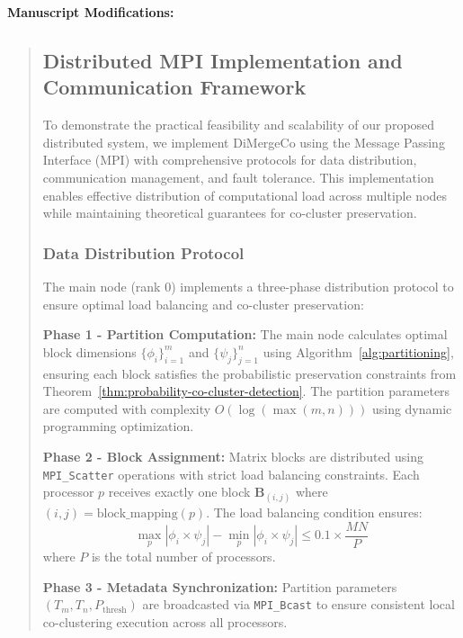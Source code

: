 \documentclass{ar2rc}
\begin{document}
\textbf{Manuscript Modifications:}

\begin{quote}
\subsection{Distributed MPI Implementation and Communication Framework}
\label{subsec:mpi-implementation}

To demonstrate the practical feasibility and scalability of our proposed distributed system, we implement DiMergeCo using the Message Passing Interface (MPI) with comprehensive protocols for data distribution, communication management, and fault tolerance. This implementation enables effective distribution of computational load across multiple nodes while maintaining theoretical guarantees for co-cluster preservation.

\subsubsection{Data Distribution Protocol}

The main node (rank 0) implements a three-phase distribution protocol to ensure optimal load balancing and co-cluster preservation:

\textbf{Phase 1 - Partition Computation:} The main node calculates optimal block dimensions $\{\phi_i\}_{i=1}^m$ and $\{\psi_j\}_{j=1}^n$ using Algorithm~\ref{alg:partitioning}, ensuring each block satisfies the probabilistic preservation constraints from Theorem~\ref{thm:probability-co-cluster-detection}. The partition parameters are computed with complexity $O(\log(\max(m,n)))$ using dynamic programming optimization.

\textbf{Phase 2 - Block Assignment:} Matrix blocks are distributed using \texttt{MPI\_Scatter} operations with strict load balancing constraints. Each processor $p$ receives exactly one block $\mathbf{B}_{(i,j)}$ where $(i,j) = \text{block\_mapping}(p)$. The load balancing condition ensures:
\begin{equation}
\max_p|\phi_i \times \psi_j| - \min_p|\phi_i \times \psi_j| \leq 0.1 \times \frac{MN}{P}
\end{equation}
where $P$ is the total number of processors.

\textbf{Phase 3 - Metadata Synchronization:} Partition parameters $(T_m, T_n, P_{\text{thresh}})$ are broadcasted via \texttt{MPI\_Bcast} to ensure consistent local co-clustering execution across all processors.


\end{quote}
\end{document}
